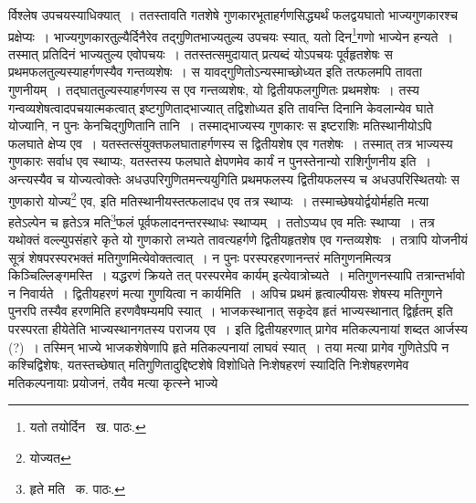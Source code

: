 \documentclass[11pt, openany]{book}
\begin{document}
\noindent र्विश्लेष उपचयस्याधिक्यात्~। ततस्तावति गतशेषे गुणकारभूताहर्गणसिद्ध्यर्थं फलद्वयघातो भाज्यगुणकारश्च प्रक्षेप्यः~। भाज्यगुणकारतुल्यैर्दिनैरेव तद्गुणितभाज्यतुल्य उपचयः स्यात्, यतो दिन\renewcommand{\thefootnote}{१}\footnote{यतो तयोर्दिन \textendash\ ख. पाठः.}गणो भाज्येन हन्यते~। तस्मात् प्रतिदिनं भाज्यतुल्य एवोपचयः~। ततस्तत्समुदायात्
प्रत्यब्दं योऽपचयः पूर्वहृतशेषः स प्रथमफलतुल्यस्याहर्गणस्यैव गन्तव्यशेषः~। स यावद्गुणितोऽन्यस्माच्छोध्यत इति तत्फलमपि तावता गुणनीयम्~। तद्घाततुल्यस्याहर्गणस्य स एव गन्तव्यशेषः, यो द्वितीयफलगुणितः प्रथमशेषः~। तस्य गन्वव्यशेषत्वादपचयात्मकत्वात् इष्टगुणिताद्भाज्यात् तद्विशोध्यत इति तावन्ति दिनानि केवलान्येव घाते योज्यानि, न पुनः केनचिद्गुणितानि तानि~। तस्माद्भाज्यस्य गुणकारः स इष्टराशिः मतिस्थानीयोऽपि फलघाते क्षेप्य एव~। यतस्तत्संयुक्तफलघाताहर्गणस्य स द्वितीयशेष एव गतशेषः~। तस्मात् तत्र भाज्यस्य गुणकारः सर्वाध एव स्थाप्यः, यतस्तस्य फलघाते क्षेपणमेव कार्यं न पुनस्तेनान्यो राशिर्गुणनीय इति~। अन्त्यस्यैव च योज्यत्वोक्तेः अधउपरिगुणितमन्त्ययुगिति प्रथमफलस्य द्वितीयफलस्य च अधउपरिस्थितयोः स गुणकारो योज्य\renewcommand{\thefootnote}{२}\footnote{योज्यत} एव, इति मतिस्थानीयस्तत्फलादध एव तत्र स्थाप्यः~। तस्माच्छेषयोर्द्वयोर्महति मत्या हतेऽल्पेन च हृतेऽत्र मति\renewcommand{\thefootnote}{३}\footnote{हृते मति \textendash\ क. पाठः.}फलं पूर्वफलादनन्तरस्थाधः स्थाप्यम्~। ततोऽप्यध एव मतिः स्थाप्या~। तत्र यथोक्तं वल्ल्युपसंहारे कृते यो गुणकारो लभ्यते तावत्यहर्गणे द्वितीयहृतशेष एव गन्तव्यशेषः~। तत्रापि योजनीयं सूत्रं {\qt शेषपरस्परभक्तं मतिगुणमि}त्येवोक्तत्वात्~। न पुनः परस्परहरणानन्तरं मतिगुणनमित्यत्र किञ्चिल्लिङ्गमस्ति~। यद्धरणं क्रियते तत् परस्परमेव कार्यम् इत्येवात्रोच्यते~। मतिगुणनस्यापि तत्रान्तर्भावो न निवार्यते~। द्वितीयहरणं मत्या गुणयित्वा न कार्यमिति~। अपिच प्रथमं हृत्वाल्पीयसः शेषस्य मतिगुणने पुनरपि तस्यैव हरणमिति हरणवैषम्यमपि स्यात्~। भाजकस्थानात् सकृदेव हृतं भाज्यस्थानात् द्विर्हृतम् इति परस्परता हीयेतेति भाज्यस्थानगतस्य पराजय एव~। इति द्वितीयहरणात् प्रागेव मतिकल्पनायां शब्दत आर्जस्य (?)~। तस्मिन् भाज्ये भाजकशेषेणापि हृते मतिकल्पनायां लाघवं स्यात्~। तया मत्या प्रागेव गुणितेऽपि न कश्चिद्विशेषः, यतस्तच्छेषात् मतिगुणितादुद्दिष्टशेषे विशोधिते निःशेषहरणं स्यादिति निःशेषहरणमेव मतिकल्पनायाः प्रयोजनं, तयैव मत्या कृत्स्ने भाज्ये

\newpage
\end{document}
